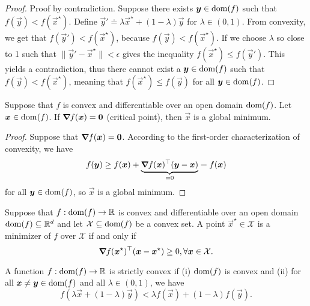 \begin{proof}
    Proof by contradiction. Suppose there exists $\bm{y}\in\mathrm{dom}(f)$ such that
    $f(\vec{y}) < f(\vec{x}^\star)$. Define $\vec{y}' \doteq \lambda \vec{x}^\star + (1-\lambda) \vec{y}$
    for $\lambda\in(0,1)$. From convexity, we get that $f(\vec{y}') < f(\vec{x}^\star)$, because
    $f(\vec{y}) < f(\vec{x}^\star)$. If we choose $\lambda$ so close to 1 such that
    $\| \vec{y}' - \vec{x}^\star \| < \epsilon$ gives the inequality $f(\vec{x}^\star) \leq f(\vec{y}')$.
    This yields a contradiction, thus there cannot exist a $\bm{y}\in\mathrm{dom}(f)$ such that
    $f(\vec{y}) < f(\vec{x}^\star)$, meaning that $f(\vec{x}^\star) \leq f(\vec{y})$ for all $\bm{y}\in\mathrm{dom}(f)$.
\end{proof}

\begin{lemma}
    Suppose that $f$ is convex and differentiable over an open domain $\mathrm{dom}(f)$. Let $\bm{x}\in\mathrm{dom}(f)$. If $\bm{\nabla}_{\! } f(\bm{x}) = \bm{0}$ (critical point), then $\vec{x}$ is a global minimum.
\end{lemma}

\begin{proof}
    Suppose that $\bm{\nabla}_{\! } f(\bm{x}) = \bm{0}$. According to the first-order characterization of convexity, we have \[
        f(\bm{y}) \geq f(\bm{x}) + \underbrace{\bm{\nabla}_{\! } f(\bm{x})^\top (\bm{y}-\bm{x})}_{=0} = f(\bm{x})
    \]
    for all $\bm{y} \in \mathrm{dom}(f)$, so $\vec{x}$ is a global minimum.
\end{proof}

\begin{lemma}
    Suppose that $f: \mathrm{dom}(f) \to \mathbb{R}$ is convex and differentiable over an open domain $\mathrm{dom}(f) \subseteq \mathbb{R}^d$ and let $\mathcal{X} \subseteq \mathrm{dom}(f)$ be a convex set. A point $\vec{x}^\star \in \mathcal{X}$ is a minimizer of $f$ over $\mathcal{X}$ if and only if \[
        \bm{\nabla}_{\! } f(\bm{x}^\star)^\top(\bm{x} - \bm{x}^\star) \geq 0, \forall \bm{x} \in \mathcal{X}.
    \]
\end{lemma}

\begin{definition}
    A function $f: \mathrm{dom}(f)\to \mathbb{R}$ is strictly convex if (i) $\mathrm{dom}(f)$ is convex and (ii) for all $\bm{x} \neq \bm{y}\in \mathrm{dom}(f)$ and all $\lambda\in(0,1)$, we have \[
        f(\lambda \vec{x} + (1-\lambda) \vec{y}) < \lambda f(\vec{x}) + (1-\lambda) f(\vec{y}).
    \]
\end{definition}

